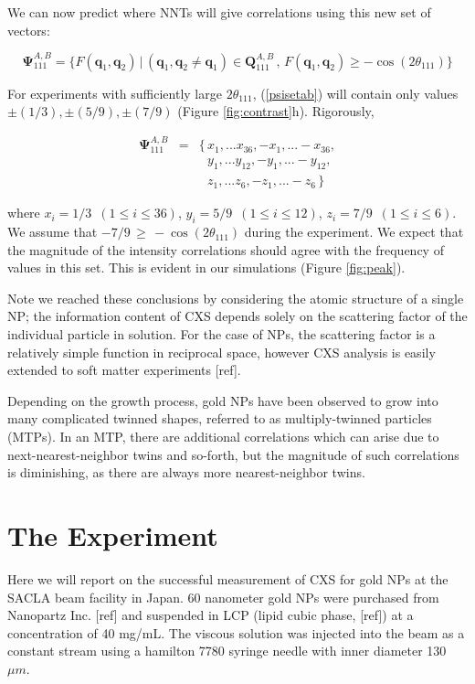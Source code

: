 \documentclass [11pt,fleqn]{article}
\def \be {\begin{equation}}
\def \ee {\end{equation}}
\def \beq {\begin{eqnarray}}
\def \eeq {\end{eqnarray}}
\begin{document}
We can now predict where NNTs will give correlations using this new set of vectors: 

\be \label{psisetab}
\bm \Psi^{A,B}_{111} = \{ F( \bm q_1, \bm q_2)\, \big | \, (\bm q_1, \bm q_2 \ne \bm q_1) \in \bm Q^{A,B}_{111}\, ,\, F( \bm q_1, \bm q_2) \ge -\cos ( 2\theta_{111}  )  \}
\ee

For experiments with sufficiently large $2\theta_{111}$, (\ref{psisetab}) will contain only values $\pm (1/3), \pm (5/9), \pm(7/9)$ (Figure \ref{fig:contrast}h).  Rigorously, 

\beq
\bm \Psi^{A,B}_{111} &=& \{\, x_1, ... x_{36}, -x_1, ... -x_{36},  \\
&&\,\,\,\, y_1, ... y_{12}, -y_1, ... -y_{12}, \\
&& \,\,\,\, z_1, ... z_6, -z_1, ... -z_6 \, \}
\eeq

where $x_i = 1/3\,\,\, (1 \le i \le 36 )$, $y_i = 5/9\,\,\, (1 \le i \le 12 )$, $z_i = 7/9\,\,\, (1 \le i \le 6 )$.  We assume that $ -7/9 \, \ge \, - \cos (2\theta_{111}) $ during the experiment. We expect that the magnitude of the intensity correlations should agree with the frequency of values in this set. This is evident in our simulations (Figure \ref{fig:peak}).

Note we reached these conclusions by considering the atomic structure of a single NP; the information content of CXS depends solely on the scattering factor of the individual particle in solution. For the case of NPs, the scattering factor is a relatively simple function in reciprocal space, however CXS analysis is easily extended to soft matter experiments [ref].

Depending on the growth process, gold NPs have been observed to grow into many complicated twinned shapes, referred to as multiply-twinned particles (MTPs). In an MTP, there are additional correlations which can arise due to next-nearest-neighbor twins and so-forth, but the magnitude of such correlations is diminishing, as there are always more nearest-neighbor twins. 

\section{The Experiment}
Here we will report on the successful measurement of CXS for gold NPs at the SACLA beam facility in Japan. 60 nanometer gold NPs were purchased from Nanopartz Inc. [ref] and suspended in LCP (lipid cubic phase, [ref]) at a concentration of 40 mg/mL. The viscous solution was injected into the beam as a constant stream using a  hamilton 7780 syringe needle with inner diameter 130 $\mu m$.
\end{document}
